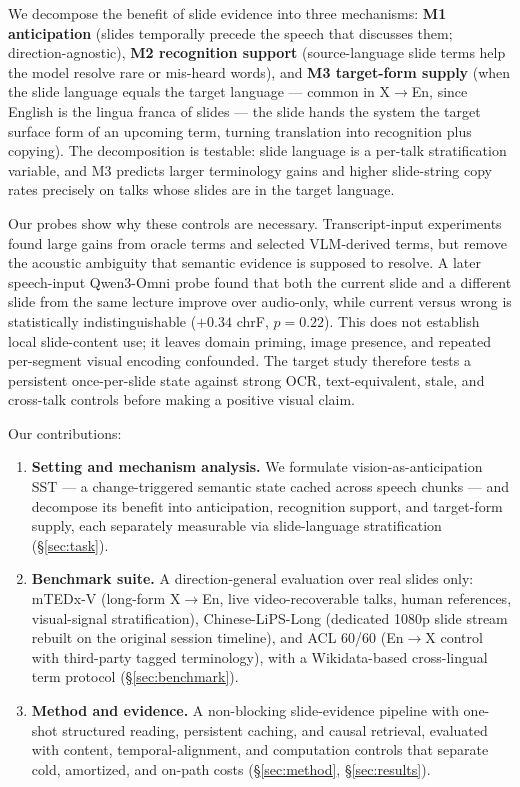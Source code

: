 We decompose the benefit of slide evidence into three mechanisms:
\textbf{M1 anticipation} (slides temporally precede the speech that discusses
them; direction-agnostic), \textbf{M2 recognition support} (source-language
slide terms help the model resolve rare or mis-heard words), and
\textbf{M3 target-form supply} (when the slide language equals the target
language --- common in X$\rightarrow$En, since English is the lingua franca of
slides --- the slide hands the system the target surface form of an upcoming
term, turning translation into recognition plus copying). The decomposition is
testable: slide language is a per-talk stratification variable, and M3 predicts
larger terminology gains and higher slide-string copy rates precisely on talks
whose slides are in the target language.

Our probes show why these controls are necessary. Transcript-input experiments
found large gains from oracle terms and selected VLM-derived terms, but remove
the acoustic ambiguity that semantic evidence is supposed to resolve. A later
speech-input Qwen3-Omni probe found that both the current slide and a different
slide from the same lecture improve over audio-only, while current versus wrong
is statistically indistinguishable ($+0.34$ chrF, $p{=}0.22$). This does not
establish local slide-content use; it leaves domain priming, image presence,
and repeated per-segment visual encoding confounded. The target study therefore
tests a persistent once-per-slide state against strong OCR, text-equivalent,
stale, and cross-talk controls before making a positive visual claim.

Our contributions:
\begin{enumerate}[leftmargin=*]
    \item \textbf{Setting and mechanism analysis.} We formulate vision-as-anticipation
    SST --- a change-triggered semantic state cached across speech chunks --- and
    decompose its benefit into anticipation, recognition support, and
    target-form supply, each separately measurable via slide-language
    stratification (\S\ref{sec:task}).
    \item \textbf{Benchmark suite.} A direction-general evaluation over real
    slides only: mTEDx-V (long-form X$\rightarrow$En, live video-recoverable
    talks, human references, visual-signal stratification), Chinese-LiPS-Long
    (dedicated 1080p slide stream rebuilt on the original session timeline),
    and ACL 60/60 (En$\rightarrow$X control with third-party tagged
    terminology), with a Wikidata-based cross-lingual term protocol
    (\S\ref{sec:benchmark}).
    \item \textbf{Method and evidence.} A non-blocking slide-evidence pipeline
    with one-shot structured reading, persistent caching, and causal retrieval,
    evaluated with content, temporal-alignment, and computation controls that
    separate cold, amortized, and on-path costs
    (\S\ref{sec:method}, \S\ref{sec:results}).
\end{enumerate}
